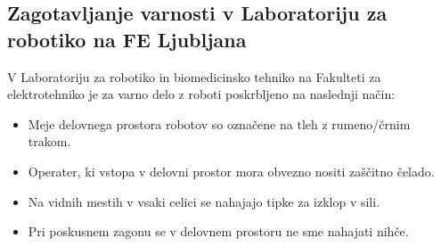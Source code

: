 \newpage
\subsection{Zagotavljanje varnosti v Laboratoriju za robotiko na FE Ljubljana}

\vspace{5mm} V Laboratoriju za robotiko in biomedicinsko tehniko
na Fakulteti za elektrotehniko je za varno delo z roboti
poskrbljeno na naslednji način:

\begin{itemize}
    \item \vspace*{-0.1cm} Meje delovnega prostora robotov so
    označene na tleh z rumeno/črnim trakom.

    \item \vspace*{-0.1cm} Operater, ki vstopa v delovni prostor
    mora obvezno nositi zaščitno čelado.

    \item \vspace*{-0.1cm} Na vidnih mestih v vsaki celici se
    nahajajo tipke za izklop v sili.

    \item \vspace*{-0.1cm}Pri poskusnem zagonu se v delovnem
    prostoru ne sme nahajati nihče.

\end{itemize}
